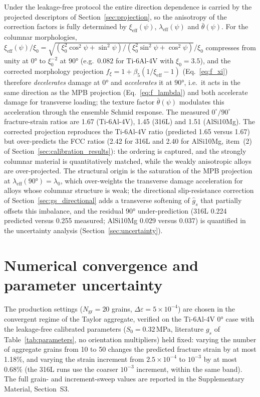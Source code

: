 Under the leakage-free protocol the entire direction dependence is carried by the projected descriptors of Section~\ref{sec:projection}, so the anisotropy of the correction factors is fully determined by $\xi_{\mathrm{eff}}(\psi)$, $\lambda_{\mathrm{eff}}(\psi)$ and $\bar\theta(\psi)$. For the columnar morphologies, $\xi_{\mathrm{eff}}(\psi)/\xi_0 = \sqrt{(\xi_0^2\cos^2\psi + \sin^2\psi)/(\xi_0^2\sin^2\psi + \cos^2\psi)}/\xi_0$ compresses from unity at $\ang{0}$ to $\xi_0^{-2}$ at $\ang{90}$ (e.g.\ $0.082$ for Ti-6Al-4V with $\xi_0 = 3.5$), and the corrected morphology projection $f_\xi = 1 + \beta_5(1/\xi_{\mathrm{eff}} - 1)$ (Eq.~\eqref{eq:f_xi}) therefore \emph{decelerates} damage at $\ang{0}$ and \emph{accelerates} it at $\ang{90}$, i.e.\ it acts in the same direction as the MPB projection (Eq.~\eqref{eq:f_lambda}) and both accelerate damage for transverse loading; the texture factor $\bar\theta(\psi)$ modulates this acceleration through the ensemble Schmid response. The measured $0^\circ/90^\circ$ fracture-strain ratios are 1.67 (Ti-6Al-4V), 1.45 (316L) and 1.51 (AlSi10Mg). The corrected projection reproduces the Ti-6Al-4V ratio (predicted 1.65 versus 1.67) but over-predicts the FCC ratios (2.42 for 316L and 2.40 for AlSi10Mg, item~(2) of Section~\ref{sec:calibration_results}): the ordering is captured, and the strongly columnar material is quantitatively matched, while the weakly anisotropic alloys are over-projected. The structural origin is the saturation of the MPB projection at $\lambda_{\mathrm{eff}}(\ang{90}) = \lambda_0$, which over-weights the transverse damage acceleration for alloys whose columnar structure is weak; the directional slip-resistance correction of Section~\ref{sec:gs_directional} adds a transverse softening of $\hat{g}_s$ that partially offsets this imbalance, and the residual $\ang{90}$ under-prediction (316L 0.224 predicted versus 0.255 measured; AlSi10Mg 0.029 versus 0.037) is quantified in the uncertainty analysis (Section~\ref{sec:uncertainty}).

\section{Numerical convergence and parameter uncertainty}
\label{sec:convergence}

The production settings ($N_{\mathrm{gr}}=20$ grains, $\Delta\varepsilon = 5\times10^{-4}$) are chosen in the convergent regime of the Taylor aggregate, verified on the Ti-6Al-4V $\ang{0}$ case with the leakage-free calibrated parameters ($S_0=0.32$\,MPa, literature $g_s$ of Table~\ref{tab:parameters}, no orientation multipliers) held fixed: varying the number of aggregate grains from 10 to 50 changes the predicted fracture strain by at most 1.18\%, and varying the strain increment from $2.5\times10^{-4}$ to $10^{-3}$ by at most 0.68\% (the 316L runs use the coarser $10^{-3}$ increment, within the same band). The full grain- and increment-sweep values are reported in the Supplementary Material, Section~S3.

